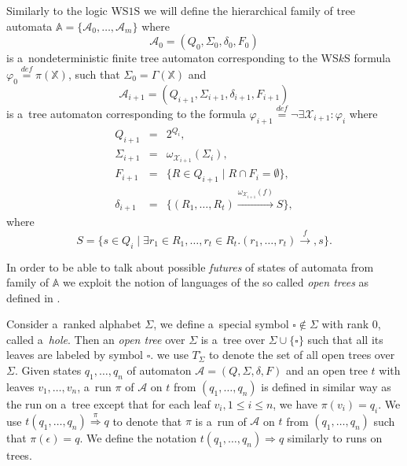 Similarly to the logic WS$1$S we will define the hierarchical family of tree
automata $\mathbb{A} = \{\mathcal{A}_0,\ldots,\mathcal{A}_m\}$ where
\begin{equation}
 \mathcal{A}_0 = (Q_0, \Sigma_0, \delta_0, F_0)
\end{equation} is a~nondeterministic finite tree automaton corresponding to the
WS$k$S formula $\varphi_0 \overset{\mathit{def}}{=} \pi(\mathbb{X})$, such that
$\Sigma_0 = \Gamma(\mathbb{X})$ and
\begin{equation}
 \mathcal{A}_{i+1} = (Q_{i+1}, \Sigma_{i+1}, \delta_{i+1}, F_{i+1})
\end{equation}
is a~tree automaton corresponding to the formula $\varphi_{i+1}
\overset{\mathit{def}}{=} \neg\exists\mathcal{X}_{i+1}: \varphi_i$ where
\begin{eqnarray}
 Q_{i+1} & = & 2^{Q_i},\\
 \Sigma_{i+1} & = & \omega_{\mathcal{X}_{i+1}}(\Sigma_i),\\
 F_{i+1} & = & \{R \in Q_{i+1} \mid R \cap F_i = \emptyset\},\\
 \delta_{i+1} & = & \{(R_1,\ldots,R_t)
 \overset{\omega_{\mathcal{X}_{i+1}}(f)}{\longrightarrow} S\},
\end{eqnarray}
where
\begin{equation}
S = \{s \in Q_i \mid \exists r_1 \in R_1,\ldots,r_t \in R_t.
 (r_1,\ldots,r_t) \overset{f}{\longrightarrow}, s\}.
\end{equation}

In order to be able to talk about possible \emph{futures} of states of automata
from family of $\mathbb{A}$ we exploit the notion of languages of the so called
\emph{open trees} as defined in \cite{tacas}.

Consider a~ranked alphabet $\Sigma$, we define a~special symbol $\square \notin
\Sigma$ with rank 0, called a~\emph{hole}. Then an \emph{open tree} over
$\Sigma$ is a~tree over $\Sigma \cup \{\square\}$ such that all its leaves are
labeled by symbol $\square$. we use $T_\Sigma^\square$ to denote the set of all
open trees over $\Sigma$. Given states $q_1,\ldots,q_n$ of automaton
$\mathcal{A} = (Q, \Sigma, \delta, F)$ and an open tree $t$ with leaves
$v_1,\ldots,v_n$, a~run $\pi$ of $\mathcal{A}$ on $t$ from $(q_1,\ldots,q_n)$ is
defined in similar way as the run on a~tree except that for each leaf $v_i, 1
\leq i \leq n$, we have $\pi(v_i) = q_i$. We use $t(q_1,\ldots,q_n)
\overset{\pi}{\Longrightarrow} q$ to denote that $\pi$ is a~run of $\mathcal{A}$
on $t$ from $(q_1,\ldots,q_n)$ such that $\pi(\epsilon) = q$. We define the
notation $t(q_1,\ldots,q_n) \Longrightarrow q$ similarly to runs on trees.

